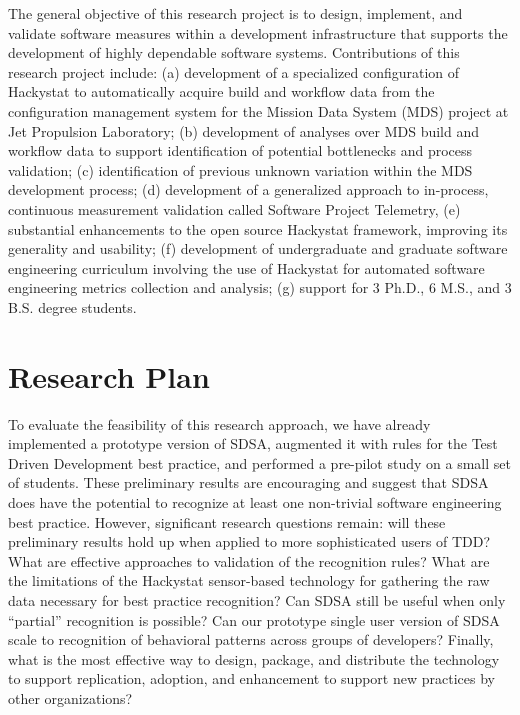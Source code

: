 The general objective of this  research project is to design,
implement, and validate software measures within a development
infrastructure that supports the development of highly dependable software
systems.  Contributions of this research project include: (a) development
of a specialized configuration of Hackystat to automatically acquire build
and workflow data from the configuration management system for the Mission
Data System (MDS) project at Jet Propulsion Laboratory; (b) development of
analyses over MDS build and workflow data to support identification of
potential bottlenecks and process validation; (c) identification of
previous unknown variation within the MDS development process; (d)
development of a generalized approach to in-process, continuous measurement
validation called Software Project Telemetry, (e) substantial enhancements
to the open source Hackystat framework, improving its generality and
usability; (f) development of undergraduate and graduate software
engineering curriculum involving the use of Hackystat for automated
software engineering metrics collection and analysis; (g) support for 3
Ph.D., 6 M.S., and 3 B.S. degree students.

\section{Research Plan}
\label{sec:research-plan}

To evaluate the feasibility of this research approach, we have already implemented
a prototype version of SDSA, augmented it with rules for the Test Driven
Development best practice, and performed a pre-pilot study on a small set
of students.  These preliminary results are encouraging and suggest that
SDSA does have the potential to recognize at least one non-trivial software
engineering best practice.  However, significant research questions remain:
will these preliminary results hold up when applied to more sophisticated
users of TDD?  What are effective approaches to validation of the
recognition rules?  What are the limitations of the Hackystat sensor-based
technology for gathering the raw data necessary for best practice
recognition?  Can SDSA still be useful when only ``partial'' recognition is
possible?  Can our prototype single user version of SDSA scale to
recognition of behavioral patterns across groups of developers? Finally,
what is the most effective way to design, package, and distribute the
technology to support replication, adoption, and enhancement to support new
practices by other organizations?

